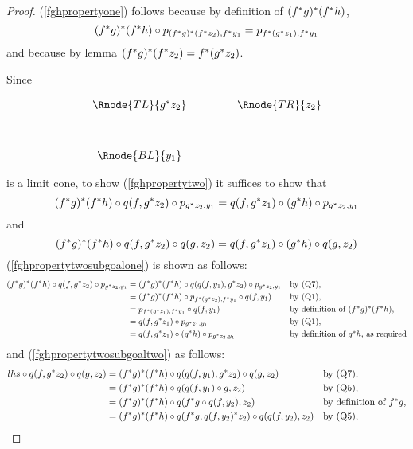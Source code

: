 \begin{proof}
(\ref{fghpropertyone}) follows because by definition of $(f^*g)^*(f^*h)$,
\begin{equation*}
(f^*g)^*(f^*h) \circ p_{(f^*g)^*(f^*z_2),f^*y_1} = p_{f^*(g^*z_1),f^*y_1}
\end{equation*}
and because by lemma  $(f^*g)^*(f^*z_2)=f^*(g^*z_2)$.

Since 
\begin{center}
\begin{equation}
\begin{array}{cp{.9cm}c}
\Rnode{TL}{g^*z_2} & & \Rnode{TR}{z_2}\\ [1.2cm]
\Rnode{BL}{\gdom}         & & 
\end{array}
\end{equation}
\end{center}
is a limit cone, to show (\ref{fghpropertytwo}) it suffices to show that  
\begin{equation}
\label{fghpropertytwosubgoalone}
(f^*g)^*(f^*h) \circ q(f,g^*z_2) \circ p_{g^*z_2,y_1} = q(f,g^*z_1) \circ (g^*h) \circ p_{g^*z_2,y_1}
\end{equation}
and
\begin{equation}
\label{fghpropertytwosubgoaltwo}
(f^*g)^*(f^*h) \circ q(f,g^*z_2) \circ q(g,z_2) = q(f,g^*z_1) \circ (g^*h) \circ q(g,z_2)
\end{equation}
(\ref{fghpropertytwosubgoalone}) is shown as follows:
\begin{align*}
(f^*g)^*(f^*h) \circ q(f,g^*z_2) \circ p_{g^*z_2,y_1} 
 &= (f^*g)^*(f^*h) \circ q(q(f,y_1),g^*z_2) \circ p_{g^*z_2,y_1} &&\mbox{by (Q7),} \\
 &= (f^*g)^*(f^*h) \circ p_{f^*(g^*z_2),f^*y_1} \circ q(f,y_1)&&\mbox{by (Q1),} \\
 &= p_{f^*(g^*z_1),f^*y_1} \circ q(f,y_1)&&\mbox{by definition of $(f^*g)^*(f^*h)$,} \\
 &= q(f,g^*z_1) \circ p_{g^*z_1,y_1}&&\mbox{by (Q1),} \\
 &= q(f,g^*z_1) \circ (g^*h) \circ p_{g^*z_2,y_1}&&\mbox{by definition of $g^*h$, as required} \\
\end{align*}
and (\ref{fghpropertytwosubgoaltwo}) as follows:
\begin{align*}
lhs \circ \qfgh \circ q(g,z_2) &= \lhs \circ q(q(f,y_1),g^*z_2)\circ q(g,z_2) && \mbox{by (Q7),} \\
    &= \lhs \circ q(q(f,y_1) \circ g, z_2) && \mbox{by (Q5),} \\
    &= \lhs \circ q(\fg \circ q(f,y_2), z_2) && \mbox{by definition of $f^*g$,} \\
    &= \lhs \circ q(\fg, q(f,y_2)^*z_2) \circ q(q(f,y_2),z_2) && \mbox{by (Q5),} \\

\end{align*}
\end{proof}
